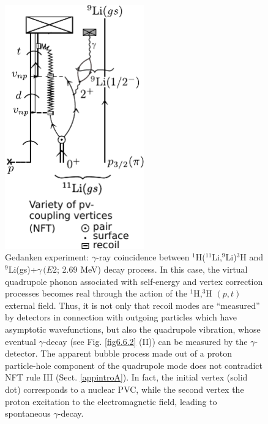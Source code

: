           \begin{figure}
          \centerline {
          \includegraphics*[width=6cm]{introduccion/figs/figintro6xxx}
          }
          \caption{Gedanken experiment: $\gamma$-ray coincidence between  $^1$H($^{11}$Li,$^9$Li)$^3$H and $^9$Li(gs)+$\gamma\, (E2$; 2.69 MeV) decay process. In  this case, the virtual quadrupole phonon associated with self-energy and vertex correction processes becomes real through the action of the $^1$H,$^3$H $(p,t)$ external field. Thus, it is not only that recoil modes are ``measured'' by  detectors in connection with outgoing particles which have  asymptotic wavefunctions, but also the quadrupole vibration, whose eventual $\gamma$-decay (see Fig. \ref{fig6.6.2} (II)) can be  measured by the $\gamma$-detector. The apparent bubble process made out of a proton particle-hole component of the quadrupole mode does not contradict NFT rule III (Sect. \ref{appintroA}). In fact, the initial vertex (solid dot) corresponds to a nuclear PVC, while the second vertex the proton excitation to the electromagnetic field, leading to spontaneous $\gamma$-decay.}
          \label{figintro6x}
          \end{figure}

